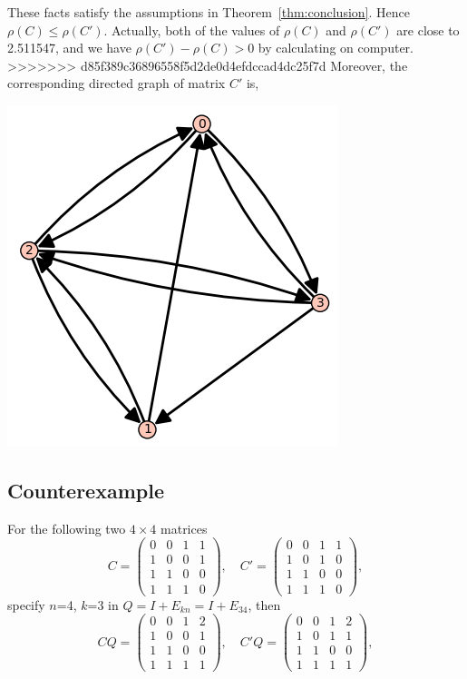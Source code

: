 \documentclass[12pt, a4paper]{article}
\theoremstyle{plain}
\theoremstyle{definition}
\begin{document}
    These facts satisfy the assumptions in Theorem~\ref{thm:conclusion}. Hence $\rho(C)\leq\rho(C')$. Actually, both of
     the values of $\rho(C)$ and $\rho(C')$ are close to 2.511547, and we have $\rho(C')-\rho(C)>0$ by calculating on
     computer.\cite[sage]{sage}
>>>>>>> d85f389c36896558f5d2de0d4efdccad4dc25f7d
    Moreover, the corresponding directed graph of matrix $C'$ is, \cite[sage]{sage}
    \begin{center}
    \includegraphics{graph_Cprime.PNG}
    \end{center}



\subsection{Counterexample}
    For the following two $4\times 4$ matrices
    $$C=\begin{pmatrix}
    0 & 0 & 1 & 1\\
    1 & 0 & 0 & 1\\
    1 & 1 & 0 & 0\\
    1 & 1 & 1 & 0
    \end{pmatrix},\quad C'=\begin{pmatrix}
    0 & 0 & 1 & 1\\
    1 & 0 & 1 &  0\\
    1 & 1 & 0 & 0\\
    1 & 1 & 1 & 0
    \end{pmatrix},$$
    specify $n$=4, $k$=3 in $Q = I +E_{kn} = I + E_{34}$, then
    $$CQ=\begin{pmatrix}
    0 & 0 & 1 & 2\\
    1 & 0 & 0 & 1\\
    1 & 1 & 0 & 0\\
    1 & 1 & 1 & 1
    \end{pmatrix},\quad C'Q=\begin{pmatrix}
    0 & 0 & 1 & 2\\
    1 & 0 & 1 & 1\\
    1 & 1 & 0 & 0\\
    1 & 1 & 1 & 1
    \end{pmatrix},$$
\end{document}
